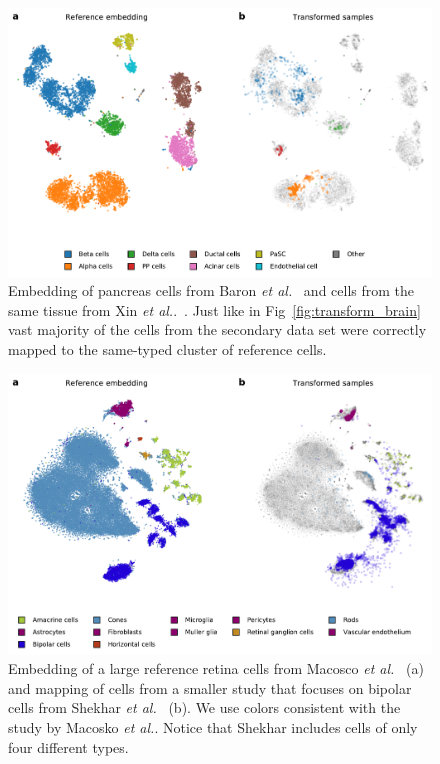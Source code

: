 \documentclass[runningheads]{llncs}
\newcommand{\etal}{\textit{et al.}}
\begin{document}
\begin{figure}[htbp]
\includegraphics[width=\textwidth]{figures/transform_pancreas.pdf}
\caption{Embedding of pancreas cells from Baron \etal~\cite{baron2016} and cells from the same tissue from Xin \etal.~\cite{xin2016}. Just like in Fig~\ref{fig:transform_brain} vast majority of the cells from the secondary data set were correctly mapped to the same-typed cluster of reference cells.}\label{fig:transform_pancreas}
\end{figure}


\begin{figure}[htbp]
\includegraphics[width=\textwidth]{figures/transform_retina.pdf}
\caption{Embedding of a large reference retina cells from Macosco \etal~\cite{macosko2015} (a) and mapping of cells from a smaller study that focuses on bipolar cells from Shekhar \etal~\cite{shekhar2016} (b). We use colors consistent with the study by Macosko \etal. Notice that Shekhar includes cells of only four different types.} \label{fig:transform_retina}
\end{figure}
\end{document}
